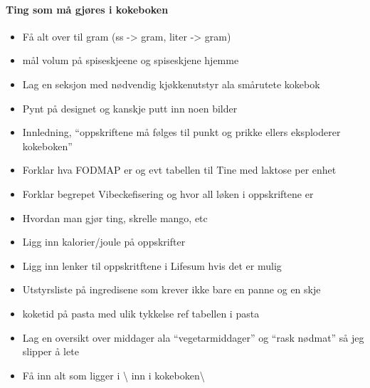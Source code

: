 
\paragraph{Ting som må gjøres i kokeboken}
\begin{itemize}[noitemsep]
  \item Få alt over til gram (ss -> gram, liter -> gram)
  \item mål volum på spiseskjeene og spiseskjene hjemme
  \item Lag en seksjon med nødvendig kjøkkenutstyr ala smårutete kokebok
  \item Pynt på designet og kanskje putt inn noen bilder
  \item Innledning, ``oppskriftene må følges til punkt og prikke ellers eksploderer kokeboken''
  \item Forklar hva FODMAP er og evt tabellen til Tine med laktose per enhet
  \item Forklar begrepet Vibeckefisering og hvor all løken i oppskriftene er
  \item Hvordan man gjør ting, skrelle mango, etc
  \item Ligg inn kalorier/joule på oppskrifter
  \item Ligg inn lenker til oppskritftene i Lifesum hvis det er mulig
  \item Utstyrsliste på ingredisene som krever ikke bare en panne og en skje
  \item koketid på pasta med ulik tykkelse ref tabellen i pasta
  \item Lag en oversikt over middager ala ``vegetarmiddager'' og ``rask nødmat'' så jeg slipper å lete
  \item Få inn alt som ligger i  \backslash{} inn i kokeboken\backslash{}
\end{itemize}
